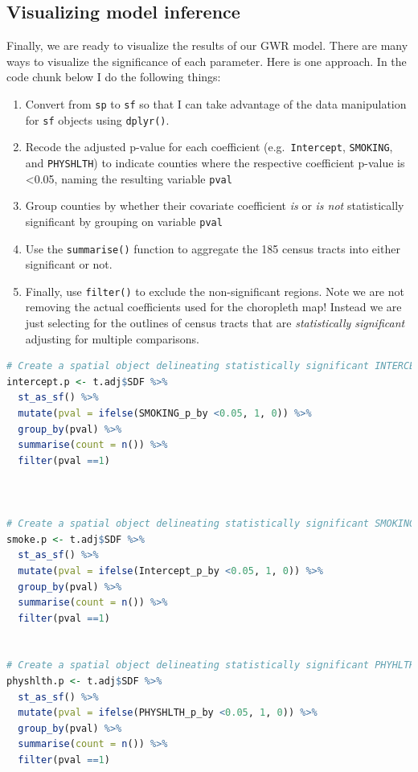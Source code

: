 \documentclass[
]{book}
\newcommand{\passthrough}[1]{#1}
\providecommand{\tightlist}{%
  \setlength{\itemsep}{0pt}\setlength{\parskip}{0pt}}
\begin{document}
\hypertarget{visualizing-model-inference}{%
\subsection{Visualizing model inference}\label{visualizing-model-inference}}

Finally, we are ready to visualize the results of our GWR model. There are many ways to visualize the significance of each parameter. Here is one approach. In the code chunk below I do the following things:

\begin{enumerate}
\def\labelenumi{\arabic{enumi}.}
\tightlist
\item
  Convert from \passthrough{\lstinline!sp!} to \passthrough{\lstinline!sf!} so that I can take advantage of the data manipulation for \passthrough{\lstinline!sf!} objects using \passthrough{\lstinline!dplyr()!}.
\item
  Recode the adjusted p-value for each coefficient (e.g.~\passthrough{\lstinline!Intercept!}, \passthrough{\lstinline!SMOKING!}, and \passthrough{\lstinline!PHYSHLTH!}) to indicate counties where the respective coefficient p-value is \textless0.05, naming the resulting variable \passthrough{\lstinline!pval!}
\item
  Group counties by whether their covariate coefficient \emph{is} or \emph{is not} statistically significant by grouping on variable \passthrough{\lstinline!pval!}
\item
  Use the \passthrough{\lstinline!summarise()!} function to aggregate the 185 census tracts into either significant or not.
\item
  Finally, use \passthrough{\lstinline!filter()!} to exclude the non-significant regions. Note we are not removing the actual coefficients used for the choropleth map! Instead we are just selecting for the outlines of census tracts that are \emph{statistically significant} adjusting for multiple comparisons.
\end{enumerate}

\begin{lstlisting}[language=R]
# Create a spatial object delineating statistically significant INTERCEPT coefficients
intercept.p <- t.adj$SDF %>%
  st_as_sf() %>%
  mutate(pval = ifelse(SMOKING_p_by <0.05, 1, 0)) %>%
  group_by(pval) %>%
  summarise(count = n()) %>%
  filter(pval ==1)



# Create a spatial object delineating statistically significant SMOKING coefficients
smoke.p <- t.adj$SDF %>%
  st_as_sf() %>%
  mutate(pval = ifelse(Intercept_p_by <0.05, 1, 0)) %>%
  group_by(pval) %>%
  summarise(count = n()) %>%
  filter(pval ==1)


# Create a spatial object delineating statistically significant PHYHLTH coefficients
physhlth.p <- t.adj$SDF %>%
  st_as_sf() %>%
  mutate(pval = ifelse(PHYSHLTH_p_by <0.05, 1, 0)) %>%
  group_by(pval) %>%
  summarise(count = n()) %>%
  filter(pval ==1)
\end{lstlisting}
\end{document}

